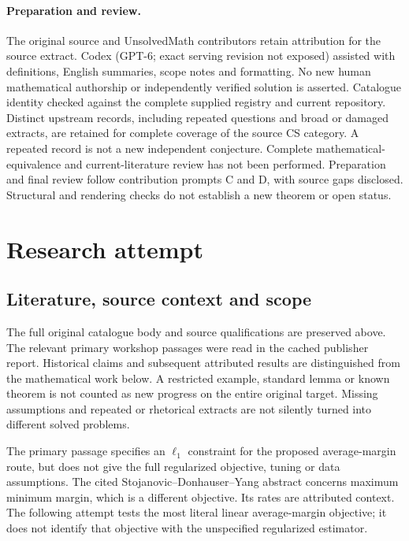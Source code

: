 \documentclass[11pt]{article}
\begin{document}
\paragraph{Preparation and review.}
The original source and UnsolvedMath contributors retain attribution for the source extract. Codex (GPT-6; exact serving revision not exposed) assisted with definitions, English summaries, scope notes and formatting. No new human mathematical authorship or independently verified solution is asserted. Catalogue identity checked against the complete supplied registry and current repository. Distinct upstream records, including repeated questions and broad or damaged extracts, are retained for complete coverage of the source CS category. A repeated record is not a new independent conjecture. Complete mathematical-equivalence and current-literature review has not been performed. Preparation and final review follow contribution prompts C and D, with source gaps disclosed. Structural and rendering checks do not establish a new theorem or open status.
\label{end:statement}

\section{Research attempt}
\subsection{Literature, source context and scope}
The full original catalogue body and source qualifications are preserved above. The relevant primary workshop passages were read in the cached publisher report. Historical claims and subsequent attributed results are distinguished from the mathematical work below. A restricted example, standard lemma or known theorem is not counted as new progress on the entire original target. Missing assumptions and repeated or rhetorical extracts are not silently turned into different solved problems.

The primary passage specifies an $\ell_1$ constraint for the proposed average-margin route, but does not give the full regularized objective, tuning or data assumptions. The cited Stojanovic--Donhauser--Yang abstract concerns maximum minimum margin, which is a different objective. Its rates are attributed context. The following attempt tests the most literal linear average-margin objective; it does not identify that objective with the unspecified regularized estimator.
\end{document}
